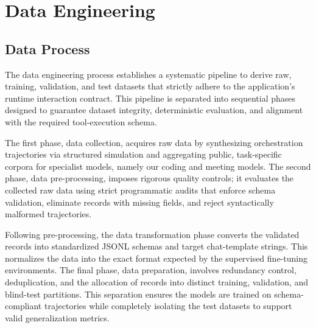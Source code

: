 \documentclass[conference]{IEEEtran}
\begin{document}
\section{Data Engineering}\label{sec:data_eng}
\subsection{Data Process}
The data engineering process establishes a systematic pipeline to derive raw, training, validation, and test datasets that strictly adhere to the application's runtime interaction contract. This pipeline is separated into sequential phases designed to guarantee dataset integrity, deterministic evaluation, and alignment with the required tool-execution schema.

The first phase, data collection, acquires raw data by synthesizing orchestration trajectories via structured simulation and aggregating public, task-specific corpora for specialist models, namely our coding and meeting models. The second phase, data pre-processing, imposes rigorous quality controls; it evaluates the collected raw data using strict programmatic audits that enforce schema validation, eliminate records with missing fields, and reject syntactically malformed trajectories.

Following pre-processing, the data transformation phase converts the validated records into standardized JSONL schemas and target chat-template strings. This normalizes the data into the exact format expected by the supervised fine-tuning environments. The final phase, data preparation, involves redundancy control, deduplication, and the allocation of records into distinct training, validation, and blind-test partitions. This separation ensures the models are trained on schema-compliant trajectories while completely isolating the test datasets to support valid generalization metrics.
\end{document}
